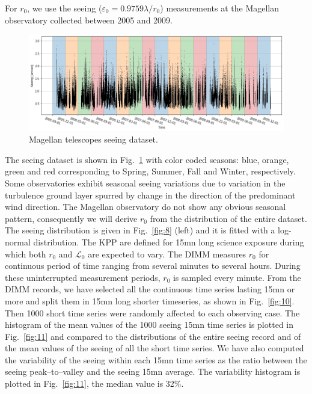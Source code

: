 \documentclass{gmto}
\begin{document}
For $r_0$, we use the seeing ($\varepsilon_0=0.9759\lambda/r_0$) measurements at the Magellan observatory collected
between 2005 and 2009.
\begin{figure}
  \centering
  \includegraphics[width=\textwidth]{seeing_seasoned.png}
  \caption{Magellan telescopes seeing dataset.}
  \label{fig:7}
\end{figure}
The seeing dataset is shown in Fig.~\ref{fig:7} with color coded seasons: blue, orange,
green and red corresponding to Spring, Summer, Fall and Winter, respectively.
Some observatories exhibit seasonal seeing variations due to variation in the
turbulence ground layer spurred by change in the direction of the predominant
wind direction.
The Magellan observatory do not show any obvious seasonal pattern,
consequently we will derive $r_0$ from the distribution of the entire dataset.
The seeing distribution is given in Fig.~\ref{fig:8} (left) and it is fitted with a log-normal
distribution.
The KPP are defined for 15mn long science exposure during which both $r_0$ and $\mathcal L_0$ are expected to vary.
The DIMM measures $r_0$ for continuous period of time ranging from several
minutes to several hours.
During these uninterrupted  measurement periods, $r_0$ is sampled every minute.
From the DIMM records, we have selected all the continuous time series lasting 15mn or more and split them in 15mn long shorter timeseries, as shown in Fig.~\ref{fig:10}.
Then 1000 short time series were randomly affected to each observing case.
The histogram of the mean values of the 1000 seeing 15mn time series is plotted in Fig.~\ref{fig:11} and compared to the distributions of the entire seeing record and of the mean values of the seeing of all the short time series.
We have also computed the variability of the seeing within each 15mn time series as the ratio between the seeing peak--to--valley and the seeing 15mn average. The variability histogram is plotted in Fig.~\ref{fig:11}, the median value is 32\%.
\end{document}
